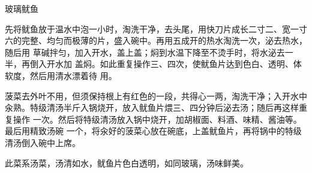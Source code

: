 \begin{recipe}{玻璃鱿鱼}

\ingredients


\preparation

\step 先将鱿鱼放于温水中泡一小时，淘洗干净，去头尾，用快刀片成长二寸二、宽一寸
六的完整、均匀而极薄的片，盛入碗中。再用五成开的热水淘洗一次，泌去热水，随后用
草碱拌匀，加入开水，盖上盖；焖到水温下降至不烫手时，将水泌去一半，再倒入开水加
盖焖。如此重复操作三、四次，使鱿鱼片达到色白、透明、体软度，然后用清水漂着待
用。

\step 菠菜去外叶不用，但须保持根上有红色的一段，共得心一两，淘洗干净；入开水中
汆熟。特级清汤半斤入锅烧开，放入鱿鱼片煨三、四分钟后泌去汤；随后再这样重复操作
一次。然后将特级清汤放入锅中烧开，加胡椒面、料酒、味精、酱油等。最后用精致汤碗
一个，将汆好的菠菜心放在碗底，上盖鱿鱼片，再将锅中的特级清汤倒入碗中上席。

\features

此菜系汤菜，汤清如水，鱿鱼片色白透明，如同玻璃，汤味鲜美。

\end{recipe}

